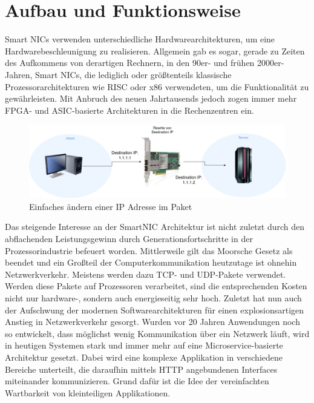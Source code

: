 \section{Aufbau und Funktionsweise}
Smart NICs verwenden unterschiedliche Hardwarearchitekturen, um eine Hardwarebeschleunigung zu realisieren. Allgemein gab es sogar, gerade zu Zeiten des Aufkommens von derartigen Rechnern, in den 90er- und frühen 2000er-Jahren, Smart NICs, die lediglich oder größtenteils klassische Prozessorarchitekturen wie RISC oder x86 verwendeten, um die Funktionalität zu gewährleisten. Mit Anbruch des neuen Jahrtausends jedoch zogen immer mehr FPGA- und ASIC-basierte Architekturen in die Rechenzentren ein.
\begin{figure}
    \centering
    \includegraphics[width=1\linewidth]{images/GrundaufbauSmartNIC.drawio.png}
    \caption{Einfaches ändern einer IP Adresse im Paket}
    \label{fig:enter-label}
\end{figure}
Das steigende Interesse an der SmartNIC Architektur ist nicht zuletzt durch den abflachenden Leistungsgewinn durch Generationsfortschritte in der Prozessorindustrie befeuert worden. Mittlerweile gilt das Moorsche Gesetz als beendet und ein Großteil der Computerkommunikation heutzutage ist ohnehin Netzwerkverkehr. Meistens werden dazu TCP- und UDP-Pakete verwendet. Werden diese Pakete auf Prozessoren verarbeitet, sind die entsprechenden Kosten nicht nur hardware-, sondern auch energieseitig sehr hoch. Zuletzt hat nun auch der Aufschwung der modernen Softwarearchitekturen für einen explosionsartigen Anstieg in Netzwerkverkehr gesorgt. Wurden vor 20 Jahren Anwendungen noch so entwickelt, dass möglichst wenig Kommunikation über ein Netzwerk läuft, wird in heutigen Systemen stark und immer mehr auf eine Microservice-basierte Architektur gesetzt. Dabei wird eine komplexe Applikation in verschiedene Bereiche unterteilt, die daraufhin mittels HTTP angebundenen Interfaces miteinander kommunizieren. Grund dafür ist die Idee der vereinfachten Wartbarkeit von kleinteiligen Applikationen.
